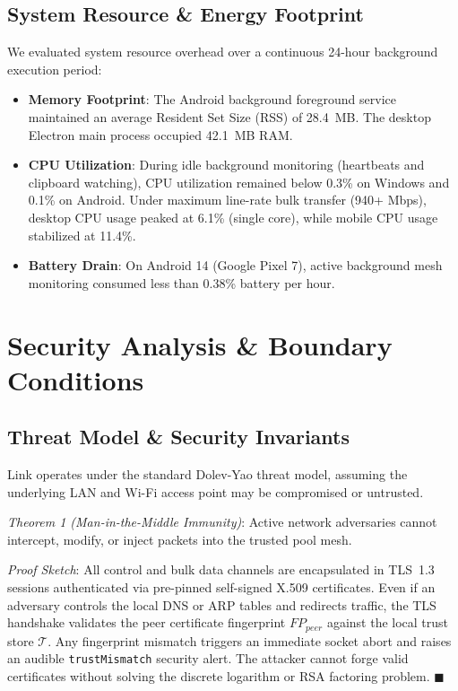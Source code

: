 \documentclass[conference]{IEEEtran}
\begin{document}
\subsection{System Resource \& Energy Footprint}
We evaluated system resource overhead over a continuous 24-hour background execution period:
\begin{itemize}
    \item \textbf{Memory Footprint}: The Android background foreground service maintained an average Resident Set Size (RSS) of 28.4~MB. The desktop Electron main process occupied 42.1~MB RAM.
    \item \textbf{CPU Utilization}: During idle background monitoring (heartbeats and clipboard watching), CPU utilization remained below 0.3\% on Windows and 0.1\% on Android. Under maximum line-rate bulk transfer (940+ Mbps), desktop CPU usage peaked at 6.1\% (single core), while mobile CPU usage stabilized at 11.4\%.
    \item \textbf{Battery Drain}: On Android 14 (Google Pixel 7), active background mesh monitoring consumed less than 0.38\% battery per hour.
\end{itemize}

\section{Security Analysis \& Boundary Conditions}
\label{sec:security}

\subsection{Threat Model \& Security Invariants}
Link operates under the standard Dolev-Yao threat model, assuming the underlying LAN and Wi-Fi access point may be compromised or untrusted.

\textit{Theorem 1 (Man-in-the-Middle Immunity)}: Active network adversaries cannot intercept, modify, or inject packets into the trusted pool mesh.

\textit{Proof Sketch}: All control and bulk data channels are encapsulated in TLS~1.3 sessions authenticated via pre-pinned self-signed X.509 certificates. Even if an adversary controls the local DNS or ARP tables and redirects traffic, the TLS handshake validates the peer certificate fingerprint $FP_{peer}$ against the local trust store $\mathcal{T}$. Any fingerprint mismatch triggers an immediate socket abort and raises an audible \texttt{trustMismatch} security alert. The attacker cannot forge valid certificates without solving the discrete logarithm or RSA factoring problem. $\blacksquare$
\end{document}
